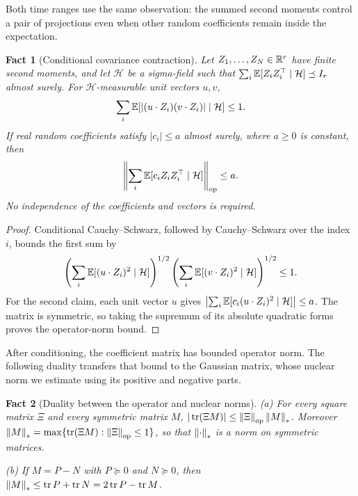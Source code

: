 \documentclass[11pt,letterpaper]{article}
\theoremstyle{plain}
\newtheorem{fact}{Fact}[section]
\begin{document}
Both time ranges use the same observation: the summed second moments
control a pair of projections even when other random coefficients
remain inside the expectation.

\begin{fact}[Conditional covariance contraction]\label{tb:covariance}
Let \(Z_1,\ldots,Z_N\in\mathbb R^r\) have finite second moments, and let
\(\mathcal H\) be a sigma-field such that
\(\sum_i\mathbb E[Z_iZ_i^\top\mid\mathcal H]\preceq I_r\) almost surely.
For \(\mathcal H\)-measurable unit vectors \(u,v\),
\[
 \sum_i\mathbb E[|(u\cdot Z_i)(v\cdot Z_i)|\mid\mathcal H]\le1.
\]
If real random coefficients satisfy \(|c_i|\le a\) almost surely,
where \(a\ge0\) is constant, then
\[
 \left\|\sum_i\mathbb E[c_iZ_iZ_i^\top\mid\mathcal H]\right\|_{\mathrm{op}}\le a.
\]
No independence of the coefficients and vectors is required.
\end{fact}

\begin{proof}
Conditional Cauchy--Schwarz, followed by Cauchy--Schwarz over the
index \(i\), bounds the first sum by
\[
 \left(\sum_i\mathbb E[(u\cdot Z_i)^2\mid\mathcal H]\right)^{1/2}
 \left(\sum_i\mathbb E[(v\cdot Z_i)^2\mid\mathcal H]\right)^{1/2}\le1.
\]
For the second claim, each unit vector \(u\) gives
\(\bigl|\sum_i\mathbb E[c_i(u\cdot Z_i)^2\mid\mathcal H]\bigr|\le a\).
The matrix is symmetric, so taking the supremum of its absolute
quadratic forms proves the operator-norm bound.
\end{proof}


After conditioning, the coefficient matrix has bounded operator norm.
The following duality transfers that bound to the Gaussian matrix, whose
nuclear norm we estimate using its positive and negative parts.

\begin{fact}[Duality between the operator and nuclear norms]\label{tb:nuclear}
(a) For every square matrix \(\Xi\) and every symmetric matrix \(M\),
\(|\operatorname{tr}(\Xi M)|\le\left\lVert\Xi\right\rVert_{\mathrm{op}}\left\lVert M\right\rVert_*\). Moreover
\(\left\lVert M\right\rVert_*=\max\{\operatorname{tr}(\Xi M):\left\lVert\Xi\right\rVert_{\mathrm{op}}\le1\}\), so that \(\left\lVert\cdot\right\rVert_*\) is
a norm on symmetric matrices.

(b) If \(M=P-N\) with \(P\succeq0\) and \(N\succeq0\), then
\(\left\lVert M\right\rVert_*\le\operatorname{tr} P+\operatorname{tr} N=2\operatorname{tr} P-\operatorname{tr} M\).
\end{fact}
\end{document}
